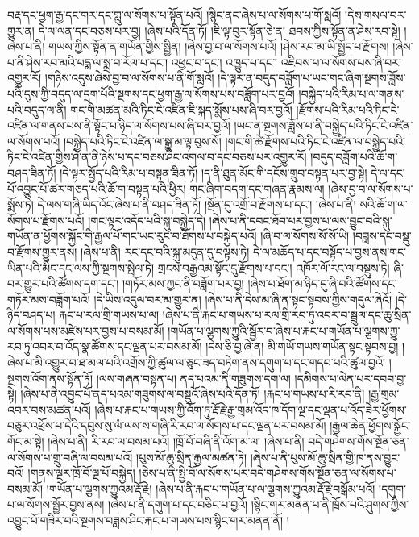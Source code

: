 བརྡ་དང་ཕྱག་རྒྱ་དང་གར་དང་གླུ་ལ་སོགས་པ་སྟོན་པའོ། །སྙིང་ནང་ཞེས་པ་ལ་སོགས་པ་གོ་སླའོ། །དེས་གསལ་བར་གྱུར་ན། དེ་ལ་ལན་དང་བཅས་པར་བྱ། །ཞེས་པའི་དོན་ཏོ། །ཇི་ལྟ་བུར་སྟོན་ཅེ་ན། ཐབས་ཀྱིས་སྟོན་ན་ཤེས་རབ་སྟེ། །
ཞེས་པ་ནི། གཡས་ཀྱིས་སྟོན་ན་གཡོན་གྱིས་སྦྱིན། །ཞེས་བྱ་བ་ལ་སོགས་པའོ། །ཤེས་རབ་མ་ཡི་སྤྱོད་པ་རྫོགས། །ཞེས་པ་ནི་ཤེས་རབ་མའི་པདྨ་ལ་སྨྲ་བ་རོལ་པ་དང་། འཕྱང་བ་དང་། འཁྱུད་པ་དང་། འཇིབས་པ་ལ་སོགས་པས་ཞི་བར་འགྱུར་རོ། །གཉིས་འདུས་ཞེས་བྱ་བ་ལ་སོགས་པ་ནི་གོ་སླའོ། །དེ་ལྟར་ན་བདུད་བཟློག་པ་ཡང་གང་ཞིག་སྔགས་ཟློས་པའི་དུས་ཀྱི་བདུད་ལ་དྲག་པོའི་སྔགས་དང་ཕྱག་རྒྱ་ལ་སོགས་པས་བཟློག་པར་བྱའོ། །བསྐྱེད་པའི་རིམ་པ་ལ་གནས་པའི་བདུད་ལ་ནི། གང་གི་མཚན་མའི་ཏིང་ངེ་འཛིན་ཇི་སྐད་སྨོས་པས་ཞི་བར་བྱའོ། །རྫོགས་པའི་རིམ་པའི་ཏིང་ངེ་འཛིན་ལ་གནས་པས་ནི་སྟོང་པ་ཉིད་ལ་སོགས་པས་ཞི་བར་བྱའོ། །ཡང་ན་སྔགས་ཟློས་པ་ནི་བསྐྱེད་པའི་ཏིང་ངེ་འཛིན་ལ་སོགས་པའོ། །བསྐྱེད་པའི་ཏིང་ངེ་འཛིན་ལ་སྒྱུ་མ་ལྟ་བུས་སོ། །གང་གི་ཚེ་རྫོགས་པའི་ཏིང་ངེ་འཛིན་ལ་བསྐྱེད་པའི་ཏིང་ངེ་འཛིན་གྱིས་ཤེ་ན་ནི་ཉེས་པ་དང་བཅས་ཤིང་འགལ་བ་དང་བཅས་པར་འགྱུར་རོ། །བདུད་བཟློག་པའི་ཆོ་ག་བཤད་ཟིན་ཏོ། །དེ་ལྟར་སྤྱོད་པའི་རིམ་པ་བསྟན་ཟིན་ཏོ། །ད་ནི་ཐུན་མོང་གི་དངོས་གྲུབ་བསྟན་པར་བྱ་སྟེ། དེ་ལ་དང་པོ་འབྱུང་པོ་ཚར་གཅད་པའི་ཆོ་ག་བསྟན་པའི་ཕྱིར། གང་ཞིག་བདག་དང་གཞན་རྣམས་ལ། །ཞེས་བྱ་བ་ལ་སོགས་པ་སྨོས་ཏེ། དེ་ལས་གཞི་ཡིད་འོང་ཞེས་པ་ནི་བཤད་ཟིན་ཏོ། །སྔོན་དུ་འགྲོ་བ་རྫོགས་པ་དང་། །ཞེས་པ་ནི། སའི་ཆོ་ག་ལ་སོགས་པ་རྫོགས་པའོ། །གང་ལྟར་འདོད་པའི་སྐུ་བསྐྱེད་དེ། །ཞེས་པ་ནི་དབང་ཐོབ་པར་བྱས་པ་ལས་བྱུང་བའི་སྐུ་གཡོན་ན་ཕྱོགས་སྐྱོང་གི་རྒྱལ་པོ་གང་ཡང་རུང་བ་ཐོགས་པ་བསྐྱེད་པའོ། །ཞི་བ་ལ་སོགས་སོ་སོ་ཡི། །བཟླས་དང་བསྡུ་བ་རྫོགས་གྱུར་ནས། །ཞེས་པ་ནི། རང་དང་​ བའི་སྐུ་མདུན་དུ་བལྟས་ཏེ། དེ་ལ་མཆོད་པ་དང་བསྟོད་པ་བྱས་ནས་གང་ཡིན་པའི་མིང་དང་ལས་ཀྱི་སྔགས་སྤེལ་ཏེ། གྲངས་བརྒྱའམ་སྟོང་དུ་རྫོགས་པ་དང་། འཁོར་ལོ་རང་ལ་བསྡུས་ཏེ། ཞི་བར་གྱུར་པའི་ཚོགས་དག་དང་། །གཏོར་མས་ཀྱང་ནི་བཟློག་པར་བྱ། །ཞེས་པ་ཐོག་མ་ཉིད་དུ་ཞི་བའི་ཚོགས་དང་གཏོར་མས་བཟློག་པའོ། །དེ་ཡིས་འདུལ་བར་མ་གྱུར་ན། །ཞེས་པ་ནི་དེས་མ་ཞི་ན་སྟང་སྟབས་ཀྱིས་གདུལ་ཞེའོ། །དེ་ཉིད་བཤད་པ། རྐང་པ་རལ་གྲི་གཡས་པ་ལ། །ཞེས་པ་ནི་རྐང་པ་གཡས་པ་རལ་གྲི་རབ་ཏུ་འབར་བ་སྦྲུལ་དང་ཆུ་སྲིན་ལ་སོགས་པས་མཛེས་པར་བྱས་པ་བསམ་མོ། །གཡོན་པ་ལྕགས་ཀྱུའི་སྦྱོར་བ་ཞེས་པ་རྐང་པ་གཡོན་པ་ལྕགས་ཀྱུ་རབ་ཏུ་འབར་བ་འོད་སྣ་ཚོགས་དང་ལྡན་པར་བསམ་མོ། །དེས་ཅི་བྱ་ཞེ་ན། མི་གཡོ་གཡས་གཡོན་སྟང་སྟབས་བྱ། །ཞེས་པ་མི་འགྱུར་བ་ཐ་མལ་པའི་འགྲོས་ཀྱི་ཚུལ་ལ་ཅུང་ཟད་བཏེག་ནས་དགུག་པ་དང་གདབ་པའི་ཚུལ་བྱའོ། །སྔགས་འོག་ནས་སྟོན་ཏོ། །ལས་གཞན་བསྟན་པ། ནད་པའམ་ནི་གཟུགས་དག་ལ། །དམིགས་པ་ལེན་པར་དབབ་བྱ་སྟེ། །ཞེས་པ་ནི་འབྱུང་པོ་ནད་པའམ་གཟུགས་ལ་བསྡུའོ་ཞེས་པའི་དོན་ཏོ། །རྐང་པ་གཡས་པ་རི་རབ་ནི། །རྒྱ་གྲམ་འབར་བས་མཚན་པའོ། །ཞེས་པ་རྐང་པ་གཡས་ཀྱི་འོག་ཏུ་རྡོ་རྗེ་རྒྱ་གྲམ་འོད་ཁ་དོག་ལྔ་དང་ལྡན་པ་འོད་ཟེར་ཕྱོགས་བཅུར་འཕྲོས་པ་དེའི་དབུས་སུ་ལཾ་ལས་ས་གཞི་རི་རབ་ལ་སོགས་པ་དང་ལྡན་པར་བསམ་མོ། །རྒྱལ་ཆེན་ཕྱོགས་སྐྱོང་གོང་མ་སྟེ། །ཞེས་པ་ནི། རི་རབ་ལ་བསམ་པའོ། །ཁྲོ་བོ་བཞི་ནི་འོག་མ་ལ། །ཞེས་པ་ནི། བདེ་གཤེགས་གོས་སྔོན་ཅན་ལ་སོགས་པ་གྲུ་བཞི་ལ་བསམ་པའོ། །པུས་མོ་ཆུ་སྲིན་རྒྱལ་མཚན་ཏེ། །ཞེས་པ་ནི་པུས་མོ་ཆུ་སྲིན་གྱི་ཁ་ནས་བྱུང་བའོ། །གནས་ལྔར་ཁྲོ་བོ་ལྔ་པོ་བསྐྱེད། །ཅེས་པ་ནི་སྤྱི་བོ་ལ་སོགས་པར་བདེ་གཤེགས་གོས་སྔོན་ཅན་ལ་སོགས་པ་བསམ་མོ། །གཡོན་པ་ལྕགས་ཀྱུའམ་རྡོ་རྗེ། །ཞེས་པ་ནི་རྐང་པ་གཡོན་པ་ལ་ལྕགས་ཀྱུའམ་རྡོ་རྗེ་བསྒོམ་པའོ། །དགུག་པ་ལ་སོགས་སྦྱོར་བྱས་ནས། །ཞེས་པ་ནི་དགུག་པ་དང་བཅིང་པ་བྱའོ། །སྙིང་གར་མནན་པ་ནི་ཁྲོས་​ པའི་ཤུགས་ཀྱིས་འབྱུང་པོ་གཟིར་བའི་སྔགས་བཟླས་ཤིང་རྐང་པ་གཡས་པས་སྙིང་གར་མནན་ནོ། །
